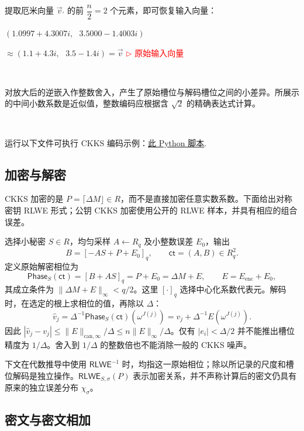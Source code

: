 提取厄米向量 $\vec{v}_{'}$ 的前 $\dfrac{n}{2} = 2$ 个元素，即可恢复输入向量：

$(1.0997+4.3007i, \text{ } 3.5000-1.4003i)$

$\approx (1.1 + 4.3i, \text{ } 3.5 - 1.4i) = \vec{v}$ \textcolor{red}{  $\rhd$ 原始输入向量}

$ $

对放大后的逆嵌入作整数舍入，产生了原始槽位与解码槽位之间的小差异。所展示的中间小数系数是近似值，整数编码应根据含 $\sqrt2$ 的精确表达式计算。

$ $

运行以下文件可执行 CKKS 编码示例：\href{https://github.com/wang2000star/fhe-textbook-cn/blob/chinese-edition/source%20code/ckks.py}{\underline{此 Python 脚本}}.



\subsection{加密与解密}
\label{subsec:ckks-enc-dec}

CKKS 加密的是 $P=\lceil\Delta M\rfloor\in R$，而不是直接加密任意实数系数。下面给出对称密钥 RLWE 形式；公钥 CKKS 加密使用公开的 RLWE 样本，并具有相应的组合误差。

\begin{tcolorbox}[title={\textbf{\tboxlabel{\ref*{subsec:ckks-enc-dec}} CKKS 加密与解密}}]
选择小秘密 $S\in R$，均匀采样 $A\leftarrow R_q$ 及小整数误差 $E_0$，输出
\[
B=[-AS+P+E_0]_q,\qquad \textsf{ct}=(A,B)\in R_q^2.
\]
定义原始解密相位为
\[
\mathsf{Phase}_S(\textsf{ct})=[B+AS]_q=P+E_0=\Delta M+E,
\qquad E=E_{\mathrm{enc}}+E_0,
\]
其成立条件为 $\|\Delta M+E\|_\infty<q/2$。这里 $[\cdot]_q$ 选择中心化系数代表元。解码时，在选定的根上求相位的值，再除以 $\Delta$：
\[
\widehat v_j=\Delta^{-1}\mathsf{Phase}_S(\textsf{ct})(\omega^{J(j)})
=v_j+\Delta^{-1}E(\omega^{J(j)}).
\]
因此 $|\widehat v_j-v_j|\leq\|E\|_{\mathrm{can},\infty}/\Delta\leq n\|E\|_\infty/\Delta$。仅有 $|e_i|<\Delta/2$ 并不能推出槽位精度为 $1/\Delta$。舍入到 $1/\Delta$ 的整数倍也不能消除一般的 CKKS 噪声。
\end{tcolorbox}

下文在代数推导中使用 $\textsf{RLWE}^{-1}$ 时，均指这一原始相位；除以所记录的尺度和槽位解码是独立操作。$\textsf{RLWE}_{S,\sigma}(P)$ 表示加密关系，并不声称计算后的密文仍具有原来的独立误差分布 $\chi_\sigma$。

\subsection{密文与密文相加}
\label{subsec:ckks-add-cipher}

